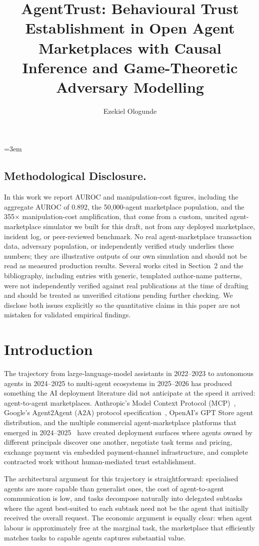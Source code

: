 \documentclass[sigconf,nonacm]{acmart}
\title{AgentTrust: Behavioural Trust Establishment in Open Agent Marketplaces with Causal Inference and Game-Theoretic Adversary Modelling}
\author{Ezekiel Ologunde}
\affiliation{%
  \institution{Independent Researcher}
  \city{Boston}
  \state{MA}
  \country{USA}}
\begin{document}
\maketitle
\sloppy
{}
\emergencystretch=3em
\hfuzz=10pt

\subsection*{Methodological Disclosure.}
In this work we report AUROC and manipulation-cost figures, including the
aggregate AUROC of 0.892, the 50{,}000-agent marketplace population, and
the 355$\times$ manipulation-cost amplification, that come from a custom,
uncited agent-marketplace simulator we built for this draft, not from any
deployed marketplace, incident log, or peer-reviewed benchmark. No real
agent-marketplace transaction data, adversary population, or independently
verified study underlies these numbers; they are illustrative outputs of
our own simulation and should not be read as measured production results.
Several works cited in Section~2 and the bibliography, including entries
with generic, templated author-name patterns, were not independently
verified against real publications at the time of drafting and should be
treated as unverified citations pending further checking. We disclose both
issues explicitly so the quantitative claims in this paper are not
mistaken for validated empirical findings.

\section{Introduction}

The trajectory from large-language-model assistants in 2022--2023 to
autonomous agents in 2024--2025 to multi-agent ecosystems in
2025--2026 has produced something the AI deployment literature did
not anticipate at the speed it arrived: agent-to-agent
marketplaces. Anthropic's Model Context Protocol
(MCP)~\cite{anthropic2024mcp}, Google's Agent2Agent (A2A) protocol
specification~\cite{google2024a2a}, OpenAI's GPT Store agent
distribution, and the multiple commercial agent-marketplace platforms
that emerged in 2024--2025~\cite{aimarket2025survey} have created
deployment surfaces where agents owned by different principals
discover one another, negotiate task terms and pricing, exchange
payment via embedded payment-channel infrastructure, and complete
contracted work without human-mediated trust establishment.

The architectural argument for this trajectory is straightforward:
specialised agents are more capable than generalist ones, the cost
of agent-to-agent communication is low, and tasks decompose
naturally into delegated subtasks where the agent best-suited to
each subtask need not be the agent that initially received the
overall request. The economic argument is equally clear: when agent
labour is approximately free at the marginal task, the marketplace
that efficiently matches tasks to capable agents captures
substantial value.
\end{document}
